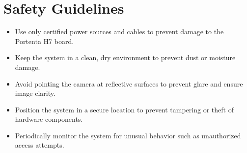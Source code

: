 %
%

\chapter{Safety Guidelines}


\begin{itemize}
	\item Use only certified power sources and cables to prevent damage to the Portenta H7 board.
	\item Keep the system in a clean, dry environment to prevent dust or moisture damage.
	\item Avoid pointing the camera at reflective surfaces to prevent glare and ensure image clarity.
	\item Position the system in a secure location to prevent tampering or theft of hardware components.
	\item Periodically monitor the system for unusual behavior such as unauthorized access attempts.
\end{itemize}


